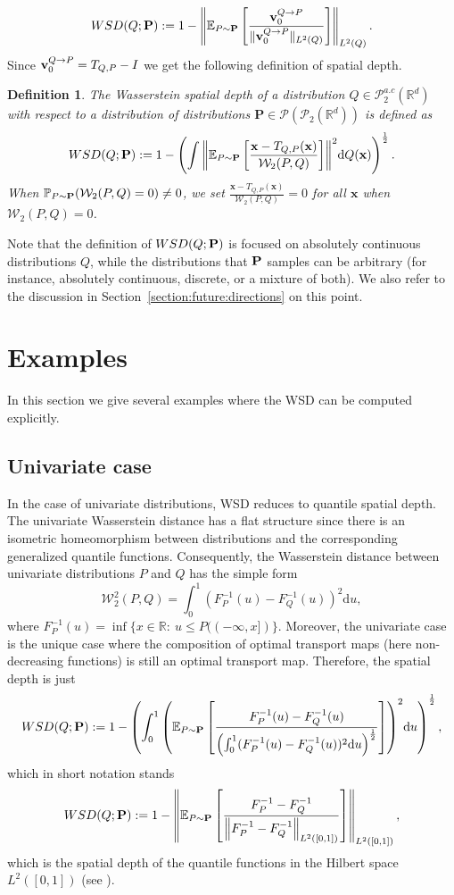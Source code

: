 \documentclass{imsart}
\newtheorem {Definition}{Definition}[section]
\numberwithin{equation}{section}
\def\R{\mathbb{R}}
\def\E{\mathbb{E}}
\def\x{\mathbf{x}}
\def\E{\mathbb E}
\def\x{\mathbf x}
\begin{document}
$$  {\rm WSD}(Q; {\bf P}):=1-   \left\|\E_{P\sim \mathbf{P}}\left[  \frac{ {\bf v}_0^{Q\to P} }{\|{\bf v}_0^{Q\to P}\|_{L^2(Q)}}\right]\right\|_{L^2(Q)}. $$
Since ${\bf v}_0^{Q\to P}= T_{Q,P}- {\rm I} $ we get the following definition of spatial depth.   
\begin{Definition}\label{Wdepth_definition}
	The Wasserstein spatial depth of a distribution $Q \in  \mathcal{P}^{a.c}_2(\R^d)$ with respect to a distribution of distributions $\mathbf{P}\in \mathcal{P}(\mathcal{P}_2(\R^d)) $ is defined as 
	$$  {\rm WSD}(Q; {\bf P}):=1-  \left(\int{ \left\|\E_{P\sim \mathbf{P}}\left[  \frac{\x-T_{Q,P}(\x) }{\mathcal{W}_2(P,Q)}\right]\right\|^2} \mathrm{d}Q(\x)\right)^{\frac{1}{2}}. $$
	When $\mathbb{P}_{P\sim {\bf P}}(\mathcal{W}_2(P,Q)=0)\neq 0$, we set $\frac{\x-T_{Q,P}(\x) }{\mathcal{W}_2(P,Q)}=0$ for all $\x$ when $\mathcal{W}_2(P,Q)=0$.
\end{Definition}

Note that the definition of $ {\rm WSD}(Q; {\bf P})$ is focused on absolutely continuous distributions $Q$, while the distributions  that ${\bf P}$ samples can be arbitrary (for instance, absolutely continuous, discrete, or a mixture of both).
We also refer to the discussion in 
Section~\ref{section:future:directions} on this point.

\section{Examples}\label{section:examples}
In this section we give several examples where the WSD can be computed explicitly.

\subsection{Univariate case}
In the case of univariate distributions, WSD reduces to quantile spatial depth.
The univariate Wasserstein distance has a flat structure since there is an isometric homeomorphism between distributions and the corresponding generalized quantile functions. Consequently, the Wasserstein distance between univariate distributions $P$ and $Q$ has the simple form
$$ \mathcal{W}_2^2(P,Q)=\int_{0}^1 (F^{-1}_P(u)- F^{-1}_Q(u) )^2 \mathrm{d}u,$$
where 
$ F^{-1}_P(u)=\inf\{x\in \R: \ u\leq P((-\infty, x])\}$.
Moreover, the univariate case is the unique case where the composition of optimal transport maps (here non-decreasing functions) is still an optimal transport map. Therefore, the spatial depth is just 
$$  {\rm WSD}(Q; {\bf P}):=1-  \left(\int_0^1{ \left(\E_{P\sim \mathbf{P}}\left[  \frac{F^{-1}_P(u)- F^{-1}_Q(u)}{\left(\int_{0}^1 (F^{-1}_P(u)- F^{-1}_Q(u) )^2 \mathrm{d}u\right)^{\frac{1}{2}}}\right]\right)^2} \mathrm{d}u\right)^{\frac{1}{2}}, $$
which in short notation stands
$$  {\rm WSD}(Q; {\bf P}):=1-  \left\|{ \E_{P\sim \mathbf{P}}\left[  \frac{F^{-1}_P- F^{-1}_Q}{\left\|F^{-1}_P- F^{-1}_Q \right\|_{L^2([0,1])} }\right]}\right\|_{L^2([0,1])}, $$
which is the spatial depth of the quantile functions in the Hilbert space $L^2([0,1])$ (see \cite{serfling2002depth,vardi2000multivariate,virta2023spatial}).
\end{document}
